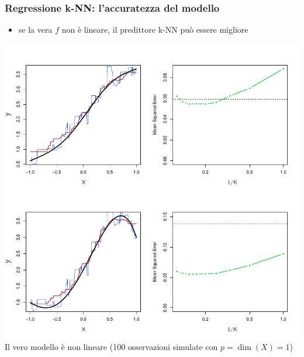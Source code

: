 {\begin{frame}

	\frametitle{Regressione k-NN: l'accuratezza del modello}

	\begin{itemize}
		\item se la vera $f$ non è lineare, il predittore k-NN può essere migliore
	\end{itemize}

	\begin{center}
		\includegraphics[scale=0.45]{images/supervised/knn_regression/3_19.pdf}\\
		Il vero modello è non lineare (100 osservazioni simulate con $p = \dim(X)=1$)
	\end{center}
\end{frame}


%
%
%

}



